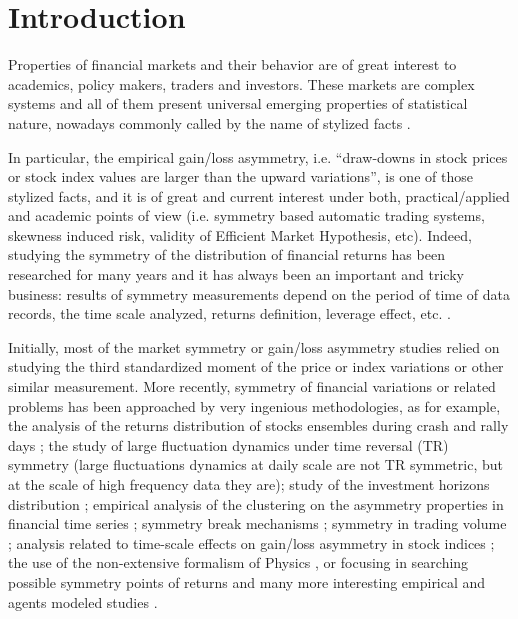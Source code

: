 \documentclass{elsarticle}
\begin{document}
\section{Introduction}

Properties of financial markets and their behavior are of great interest to academics, policy makers, traders and investors. These markets are complex systems and all of them present universal emerging properties of statistical nature, nowadays commonly called by the name of stylized facts \cite{Kaldor,Cont}.

In particular, the empirical gain/loss asymmetry, i.e.  ``draw-downs in stock prices or stock index values are larger than the upward variations'', is one of those stylized facts, and it is of great and current interest under both, practical/applied and academic points of view (i.e. symmetry based automatic trading systems, skewness induced risk, validity of Efficient Market Hypothesis, etc). Indeed, studying the symmetry of the distribution of financial returns has been researched for many years and it has always been an important and tricky business: results of symmetry measurements depend on the period of time of data records, the time scale analyzed, returns definition, leverage effect, etc. \cite{Beedles,Fogler,Bouchaud,Jensen2,Dutta,deAlmeida}.

Initially, most of the market symmetry or gain/loss asymmetry studies relied on studying the third standardized moment of the price or index variations or other similar measurement. More recently, symmetry of financial variations or related problems has been approached by very ingenious methodologies, as for example, the analysis of the returns distribution of stocks ensembles during crash and rally days \cite{Lillo}; the study of large fluctuation dynamics under time reversal (TR) symmetry (large fluctuations dynamics at daily scale are not TR symmetric, but at the scale of high frequency data they are)\cite{Jiang}; study of the investment horizons distribution \cite{Jensen,Karpio}; empirical analysis of the clustering on the asymmetry properties in financial time series \cite{Jun}; symmetry break mechanisms \cite{Savona}; symmetry in trading volume \cite{Duarte}; analysis related to time-scale effects on gain/loss asymmetry in stock indices \cite{Zoltan}; the use of the non-extensive formalism of Physics \cite{Grech}, or focusing in searching possible symmetry points of returns \cite{Coronel-Montoya} and many more interesting empirical and agents modeled studies \cite{Vitalies,Takayasu}.
\end{document}
